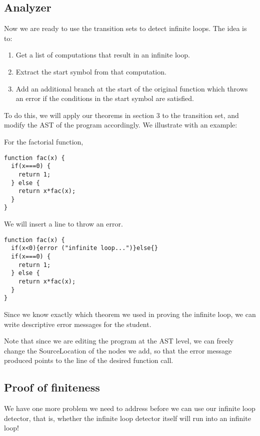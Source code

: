 \subsection{Analyzer}
Now we are ready to use the transition sets to detect infinite loops.
The idea is to:
\begin{enumerate}
\item Get a list of computations that result in an infinite loop.
\item Extract the start symbol from that computation.
\item Add an additional branch at the start of the original function which throws an error if the conditions in the start symbol are satisfied.
\end{enumerate}

To do this, we will apply our theorems in section 3 to the transition set, and modify the AST of the program accordingly. We illustrate with an example:

\begin{example}
  For the factorial function,
\begin{lstlisting}
function fac(x) {
  if(x===0) {
    return 1;
  } else {
    return x*fac(x);
  }
}
\end{lstlisting}

  \noindent
  We will insert a line to throw an error.
\begin{lstlisting}
function fac(x) {
  if(x<0){error ("infinite loop...")}else{}
  if(x===0) {
    return 1;
  } else {
    return x*fac(x);
  }
}
\end{lstlisting}
\noindent
Since we know exactly which theorem we used in proving the infinite loop, we can write
descriptive error messages for the student.
  
\end{example}



Note that since we are editing the program at the AST level, we can freely change the SourceLocation of the nodes we add, so that the error message produced points to the line of the desired function call.

\subsection{Proof of finiteness}
We have one more problem we need to address before we can use our infinite loop detector, that is,
whether the infinite loop detector itself will run into an infinite loop!

